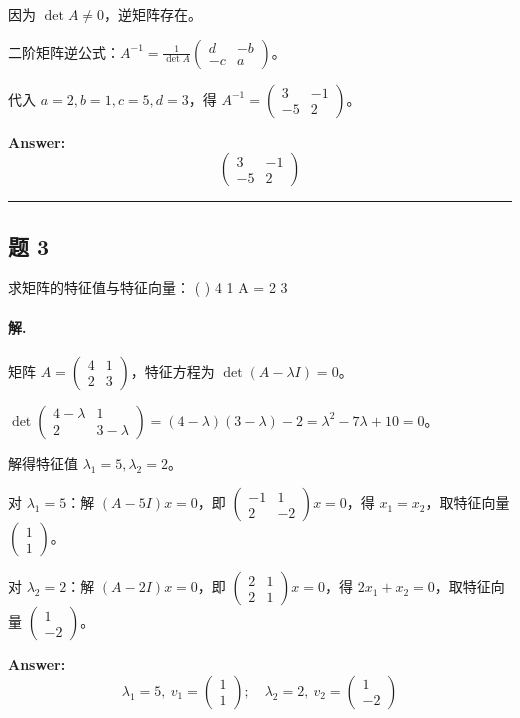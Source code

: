 \documentclass[12pt, a4paper]{article}
\newcommand{\problem}[1]{\subsection*{题 #1}}
\newcommand{\solution}{\paragraph{解.}}
\begin{document}
因为 $\det A\neq0$，逆矩阵存在。

二阶矩阵逆公式：$A^{-1}=\frac{1}{\det A}\begin{pmatrix}d&-b\\-c&a\end{pmatrix}$。

代入 $a=2,b=1,c=5,d=3$，得 $A^{-1}=\begin{pmatrix}3&-1\\-5&2\end{pmatrix}$。

\textbf{Answer:}
\[\boxed{\begin{pmatrix}3&-1\\-5&2\end{pmatrix}}\]

\vspace{1em}
\hrule
\vspace{1em}

\problem{3}

求矩阵的特征值与特征向量：
( )
4 1
A =
2 3

\solution

矩阵 $A=\begin{pmatrix}4&1\\2&3\end{pmatrix}$，特征方程为 $\det(A-\lambda I)=0$。

$\det\begin{pmatrix}4-\lambda&1\\2&3-\lambda\end{pmatrix}=(4-\lambda)(3-\lambda)-2=\lambda^2-7\lambda+10=0$。

解得特征值 $\lambda_1=5,\lambda_2=2$。

对 $\lambda_1=5$：解 $(A-5I)x=0$，即 $\begin{pmatrix}-1&1\\2&-2\end{pmatrix}x=0$，得 $x_1=x_2$，取特征向量 $\begin{pmatrix}1\\1\end{pmatrix}$。

对 $\lambda_2=2$：解 $(A-2I)x=0$，即 $\begin{pmatrix}2&1\\2&1\end{pmatrix}x=0$，得 $2x_1+x_2=0$，取特征向量 $\begin{pmatrix}1\\-2\end{pmatrix}$。

\textbf{Answer:}
\[\boxed{\lambda_1=5,\ v_1=\begin{pmatrix}1\\1\end{pmatrix};\quad \lambda_2=2,\ v_2=\begin{pmatrix}1\\-2\end{pmatrix}}\]
\end{document}
